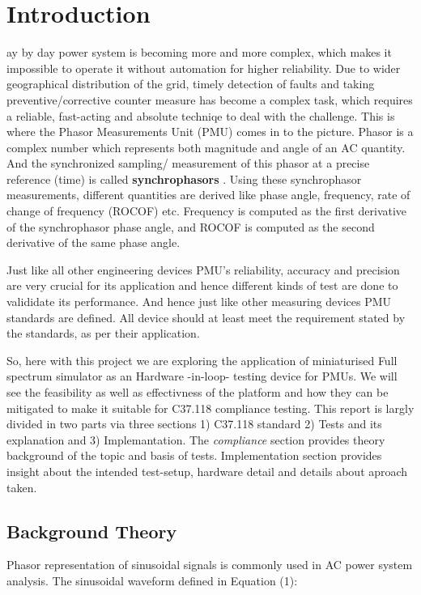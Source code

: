 \section{Introduction}
ay by day power system is becoming more and more complex, which makes it impossible to operate it without automation for higher reliability. Due to wider geographical distribution of the grid, timely detection of faults and taking preventive/corrective counter measure  has become a complex task, which requires a reliable, fast-acting and absolute techniqe to deal with the challenge. This is where the Phasor Measurements Unit (PMU) comes in to the picture. Phasor is a complex number which represents both magnitude and angle of an AC quantity. And the synchronized sampling/ measurement of this phasor at a precise reference (time) is called \textbf{synchrophasors} \cite{std:c37}. Using these synchrophasor measurements, different quantities are derived like phase angle, frequency, rate of change of frequency (ROCOF) etc. Frequency is computed as the first derivative of the synchrophasor phase angle, and ROCOF is computed as the second derivative of the same phase angle. 

Just like all other engineering devices PMU's reliability, accuracy  and precision are very crucial for its application and hence different kinds of test are done to valididate its performance. And hence just like other measuring devices PMU standards are defined. All device should at least meet the requirement stated by the standards, as per their application. 

So, here with this project we are exploring the application of miniaturised Full spectrum simulator as an Hardware -in-loop- testing device for PMUs. We will see the feasibility as well as effectivness of the platform and how they can be mitigated to make it suitable for C37.118 compliance testing. This report is largly divided in two parts via three sections 1) C37.118 standard 2) Tests and its explanation and 3) Implemantation. The \textit{compliance} section provides theory background of the topic and basis of tests. Implementation section provides insight about the intended test-setup, hardware detail and details about aproach taken. 

\subsection{Background Theory}
Phasor representation of sinusoidal signals is commonly used in AC power system analysis. The sinusoidal waveform defined in Equation (1):


